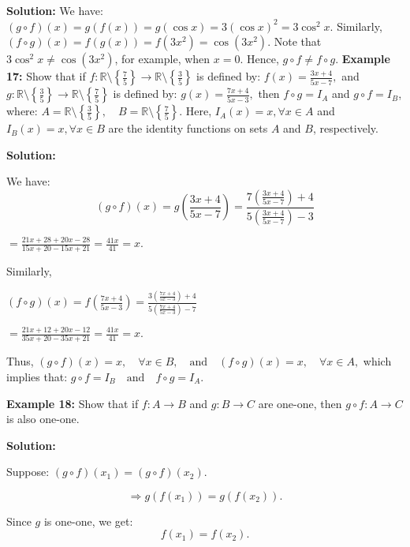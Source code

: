\documentclass[12pt]{article}
\begin{document}
\textbf{Solution:}  
We have:
\(
(g \circ f)(x) = g(f(x)) = g(\cos x) = 3 (\cos x)^2 = 3 \cos^2 x.
\)
Similarly,
\(
(f \circ g)(x) = f(g(x)) = f(3x^2) = \cos (3x^2).
\)
Note that \( 3 \cos^2 x \neq \cos(3x^2) \), for example, when \( x = 0 \).  
Hence, 
\(
g \circ f \neq f \circ g.
\)\newline
\textbf{Example 17:}  
Show that if \( f: \mathbb{R} \setminus \left\{\frac{7}{5}\right\} \to \mathbb{R} \setminus \left\{\frac{3}{5}\right\} \) is defined by:
\(
f(x) = \frac{3x + 4}{5x - 7},
\)
and \( g: \mathbb{R} \setminus \left\{\frac{3}{5}\right\} \to \mathbb{R} \setminus \left\{\frac{7}{5}\right\} \) is defined by:
\(
g(x) = \frac{7x + 4}{5x - 3},
\)
then \( f \circ g = I_A \) and \( g \circ f = I_B \), where:
\(
A = \mathbb{R} \setminus \left\{\frac{3}{5}\right\}, \quad B = \mathbb{R} \setminus \left\{\frac{7}{5}\right\}.
\)
Here, \( I_A(x) = x, \forall x \in A \) and \( I_B(x) = x, \forall x \in B \) are the identity functions on sets \( A \) and \( B \), respectively.\newline

\textbf{Solution:}  

We have:
\[
(g \circ f)(x) = g \left( \frac{3x+4}{5x-7} \right) = \frac{7 \left( \frac{3x+4}{5x-7} \right) + 4}{5 \left( \frac{3x+4}{5x-7} \right) - 3}
\]

\(
= \frac{21x+28 + 20x - 28}{15x + 20 - 15x + 21} = \frac{41x}{41} = x.
\)

Similarly,

\(
(f \circ g)(x) = f \left( \frac{7x+4}{5x-3} \right) = \frac{3 \left( \frac{7x+4}{5x-3} \right) + 4}{5 \left( \frac{7x+4}{5x-3} \right) - 7}
\)

\(
= \frac{21x+12 + 20x - 12}{35x + 20 - 35x + 21} = \frac{41x}{41} = x.
\)

Thus, 
\(
(g \circ f)(x) = x, \quad \forall x \in B, \quad \text{and} \quad (f \circ g)(x) = x, \quad \forall x \in A,
\)
which implies that:
\(
g \circ f = I_B \quad \text{and} \quad f \circ g = I_A.
\)\newline

\textbf{Example 18:}  
Show that if \( f: A \to B \) and \( g: B \to C \) are one-one, then \( g \circ f: A \to C \) is also one-one.\newline

\textbf{Solution:}  

Suppose:
\(
(g \circ f)(x_1) = (g \circ f)(x_2).
\)

\[
\Rightarrow g(f(x_1)) = g(f(x_2)).
\]

Since \( g \) is one-one, we get:
\[
f(x_1) = f(x_2).
\]
\end{document}
